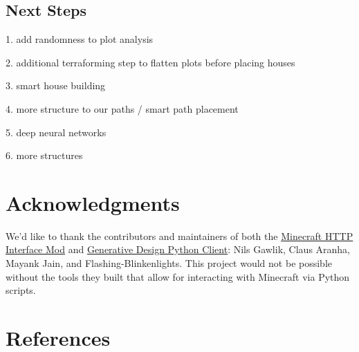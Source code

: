 \documentclass[11pt, oneside]{article}
\begin{document}
\begin{normalsize}
\subsection{Next Steps}

1. add randomness to plot analysis

2. additional terraforming step to flatten plots before placing houses

3. smart house building 

4. more structure to our paths / smart path placement

5. deep neural networks

6. more structures 


\section{Acknowledgments}
\label{Acknowledgments}

We'd like to thank the contributors and maintainers of both the \href{https://github.com/nilsgawlik/gdmc_http_interface}{Minecraft HTTP Interface Mod} and \href{https://github.com/nilsgawlik/gdmc_http_client_python}{Generative Design Python Client}: Nils Gawlik, Claus Aranha, Mayank Jain, and Flashing-Blinkenlights. This project would not be possible without the tools they built that allow for interacting with Minecraft via Python scripts.

\newpage

\section{References}
\label{references}
\nocite{*}
\printbibliography[heading=none]

\end{normalsize}
\end{document}

